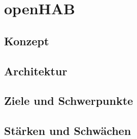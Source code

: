 \section{openHAB}
\label{sec:openhab}
\subsection{Konzept}
\subsection{Architektur}
\subsection{Ziele und Schwerpunkte}
\subsection{Stärken und Schwächen}

